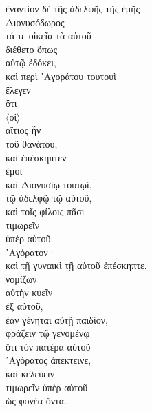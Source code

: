 
{\large
\noindent ἐναντίον δὲ τῆς ἀδελφῆς τῆς ἐμῆς \\
Διονυσόδωρος \\
τά τε οἰκεῖα τὰ αὑτοῦ \\
διέθετο ὅπως \\
\tabto{2em} αὐτῷ ἐδόκει, \\
καὶ περὶ ᾿Αγοράτου τουτουὶ \\
ἔλεγεν \\
\tabto{2em} ὅτι \\
\tabto{4em} $\langle$οἱ$\rangle$ \\
\tabto{4em} αἴτιος ἦν \\
\tabto{6em} τοῦ θανάτου, \\
καὶ ἐπέσκηπτεν \\
\tabto{2em} ἐμοὶ \\
\tabto{2em} καὶ Διονυσίῳ τουτῳί, \\
\tabto{4em} τῷ ἀδελφῷ τῷ αὑτοῦ, \\
\tabto{2em} καὶ τοῖς φίλοις πᾶσι \\
τιμωρεῖν \\
\tabto{2em} ὑπὲρ αὑτοῦ \\
᾿Αγόρατον· \\
καὶ τῇ γυναικὶ τῇ αὑτοῦ ἐπέσκηπτε, \\
νομίζων \\
\tabto{2em} \underline{αὐτὴν κυεῖν} \\
\tabto{4em} ἐξ αὑτοῦ, \\
ἐὰν γένηται αὐτῇ παιδίον, \\
\tabto{2em} φράζειν τῷ γενομένῳ \\
\tabto{4em} ὅτι τὸν πατέρα αὐτοῦ \\
\tabto{4em} ᾿Αγόρατος ἀπέκτεινε, \\
\tabto{2em} καὶ κελεύειν \\
\tabto{4em} τιμωρεῖν ὑπὲρ αὑτοῦ \\
\tabto{6em} ὡς φονέα ὄντα.\\

}

